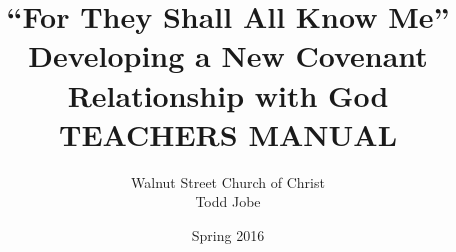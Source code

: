 

\usepackage{bibleref} %
\usepackage{multicol} %
\usepackage{attrib} %
\usepackage{booktabs} %
\usepackage{graphicx} %

%
%
%
%
%
%
%
%
%
%
\title{``For They Shall All Know Me''\\\Large{Developing a New Covenant Relationship with God}\\\LARGE\uppercase{TEACHERS MANUAL}}
\author{Walnut Street Church of Christ\\Todd Jobe}
\date{Spring 2016}


